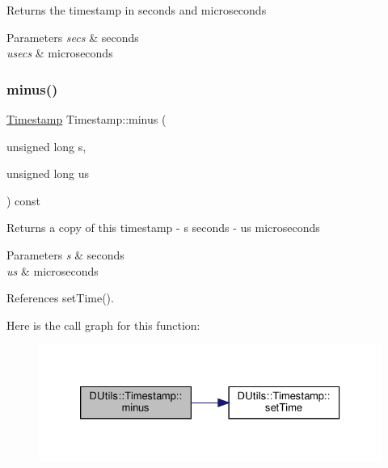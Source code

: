 Returns the timestamp in seconds and microseconds 
\begin{DoxyParams}{Parameters}
{\em secs} & seconds \\
\hline
{\em usecs} & microseconds \\
\hline
\end{DoxyParams}
\mbox{\label{classDUtils_1_1Timestamp_a5777e11b3f04827e2c310c0ab147e5bf}} 
\subsubsection{\texorpdfstring{minus()}{minus()}}
{\footnotesize\ttfamily \hyperlink{classDUtils_1_1Timestamp}{Timestamp} Timestamp\+::minus (\begin{DoxyParamCaption}\item[{unsigned long}]{s,  }\item[{unsigned long}]{us }\end{DoxyParamCaption}) const}

Returns a copy of this timestamp -\/ s seconds -\/ us microseconds 
\begin{DoxyParams}{Parameters}
{\em s} & seconds \\
\hline
{\em us} & microseconds \\
\hline
\end{DoxyParams}


References set\+Time().

Here is the call graph for this function\+:\nopagebreak
\begin{figure}[H]
\begin{center}
\leavevmode
\includegraphics[width=326pt]{classDUtils_1_1Timestamp_a5777e11b3f04827e2c310c0ab147e5bf_cgraph}
\end{center}
\end{figure}
\mbox{\label{classDUtils_1_1Timestamp_a12ecf62650e5582707cf9fb30f1b2d87}} 
